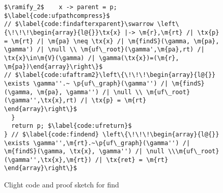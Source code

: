 \begin{figure}[t]
\begin{lstlisting}
$\ramify_2$    x -> parent = p; $\label{code:ufpathcompress}$
// $\label{code:findafterxparent}\swarrow \left\{\!\!\!\begin{array}{l@{}}\tx{x} |-> \m{r},\m{rt} /| \tx{p} = \m{rt} /| \m{pa} \neq \tx{x} /| \m{findS}(\gamma, \m{pa}, \gamma') /| \null \\ \m{uf\_root}(\gamma',\m{pa},rt) /| \tx{x}\in\m{V}(\gamma) /| \gamma(\tx{x})=(\m{r}, \m{pa})\end{array}\right\}$
// $\label{code:ufaftram2}\left\{\!\!\!\begin{array}{l@{}} \exists \gamma''.~ \p{uf\_graph}(\gamma'') /| \m{findS}(\gamma, \m{pa}, \gamma'') /| \null \\ \m{uf\_root}(\gamma'',\tx{x},rt) /| \tx{p} = \m{rt} \end{array}\right\}$
  }
  return p; $\label{code:ufreturn}$
} // $\label{code:findend} \left\{\!\!\!\begin{array}{l@{}} \exists \gamma'',\m{rt}.~\p{uf\_graph}(\gamma'') /| \m{findS}(\gamma, \tx{x}, \gamma'') /| \null \\\m{uf\_root}(\gamma'',\tx{x},\m{rt}) /| \tx{ret} = \m{rt}  \end{array}\right\}$
\end{lstlisting}







\vspace{-0.4em}
\caption{Clight code and proof sketch for find}
\label{fig:find}
\vspace{-1em}
\end{figure} 